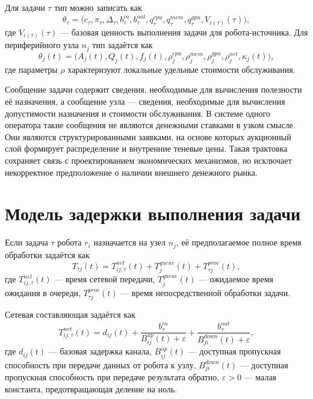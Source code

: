 Для задачи $\tau$ тип можно записать как
\begin{equation}
    \theta_{\tau}=\bigl(c_{\tau},\pi_{\tau},\Delta_{\tau},b^{in}_{\tau},b^{out}_{\tau},q^{cpu}_{\tau},q^{mem}_{\tau},q^{gpu}_{\tau},V_{i(\tau)}(\tau)\bigr),
    \label{eq:ch2_task_type}
\end{equation}
где $V_{i(\tau)}(\tau)$ --- базовая ценность выполнения задачи для робота-источника. Для периферийного узла $n_j$ тип задаётся как
\begin{equation}
    \theta_j(t)=\bigl(A_j(t),Q_j(t),f_j(t),\rho^{cpu}_j,\rho^{mem}_j,\rho^{gpu}_j,\rho^{net}_j,\kappa_j(t)\bigr),
    \label{eq:ch2_node_type}
\end{equation}
где параметры $\rho$ характеризуют локальные удельные стоимости обслуживания.

Сообщение задачи содержит сведения, необходимые для вычисления полезности её назначения, а сообщение узла --- сведения, необходимые для вычисления допустимости назначения и стоимости обслуживания. В системе одного оператора такие сообщения не являются денежными ставками в узком смысле. Они являются структурированными заявками, на основе которых аукционный слой формирует распределение и внутренние теневые цены. Такая трактовка сохраняет связь с проектированием экономических механизмов, но исключает некорректное предположение о наличии внешнего денежного рынка.

\section{Модель задержки выполнения задачи}

Если задача $\tau$ робота $r_i$ назначается на узел $n_j$, её предполагаемое полное время обработки задаётся как
\begin{equation}
    T_{\tau j}(t)=T^{net}_{ij,\tau}(t)+T^{queue}_{j}(t)+T^{proc}_{\tau j}(t),
    \label{eq:ch2_task_time}
\end{equation}
где $T^{net}_{ij,\tau}(t)$ --- время сетевой передачи, $T^{queue}_{j}(t)$ --- ожидаемое время ожидания в очереди, $T^{proc}_{\tau j}(t)$ --- время непосредственной обработки задачи.

Сетевая составляющая задаётся как
\begin{equation}
    T^{net}_{ij,\tau}(t)=d_{ij}(t)+\frac{b^{in}_{\tau}}{B^{up}_{ij}(t)+\varepsilon}+\frac{b^{out}_{\tau}}{B^{down}_{ji}(t)+\varepsilon},
    \label{eq:ch2_network_time}
\end{equation}
где $d_{ij}(t)$ --- базовая задержка канала, $B^{up}_{ij}(t)$ --- доступная пропускная способность при передаче данных от робота к узлу, $B^{down}_{ji}(t)$ --- доступная пропускная способность при передаче результата обратно, $\varepsilon>0$ --- малая константа, предотвращающая деление на ноль.


